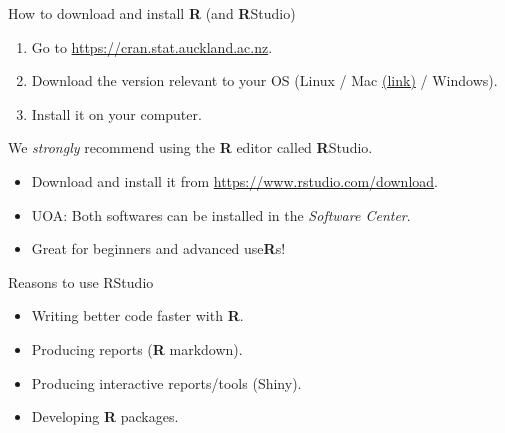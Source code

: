 \documentclass[ignorenonframetext,]{beamer}
\providecommand{\tightlist}{%
  \setlength{\itemsep}{0pt}\setlength{\parskip}{0pt}}
\begin{document}
\begin{frame}{How to download and install \textbf{R} (and
\textbf{R}Studio)}

\begin{enumerate}
\def\labelenumi{\arabic{enumi}.}
\tightlist
\item
  Go to \url{https://cran.stat.auckland.ac.nz}.
\item
  Download the version relevant to your OS (Linux / Mac
  \href{https://medium.com/@GalarnykMichael/install-r-and-rstudio-on-mac-e911606ce4f4}{(link)}
  / Windows).
\item
  Install it on your computer.
\end{enumerate}

We \emph{strongly} recommend using the \textbf{R} editor called
\textbf{R}Studio.

\begin{itemize}
\tightlist
\item
  Download and install it from \url{https://www.rstudio.com/download}.
\item
  UOA: Both softwares can be installed in the \emph{Software Center}.
\item
  Great for beginners and advanced use\textbf{R}s!
\end{itemize}

\begin{block}{Reasons to use RStudio}

\begin{itemize}
\tightlist
\item
  Writing better code faster with \textbf{R}.
\item
  Producing reports (\textbf{R} markdown).
\item
  Producing interactive reports/tools (Shiny).
\item
  Developing \textbf{R} packages.
\end{itemize}

\end{block}

\end{frame}
\end{document}
